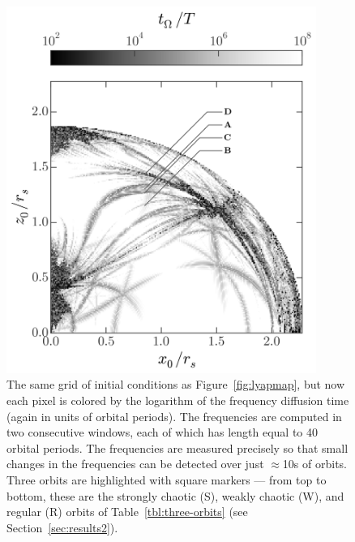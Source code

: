 \documentclass[letterpaper,12pt,preprint]{aastex}
\begin{document}
\begin{figure}[p]
\begin{center}
\includegraphics[width=0.9\textwidth, trim={0 1cm 0 0}]{figures/fdiff_map.png}
\caption{The same grid of initial conditions as Figure~\ref{fig:lyapmap}, but now each pixel is colored by the logarithm of the frequency diffusion time (again in units of orbital periods). The frequencies are computed in two consecutive windows, each of which has length equal to 40 orbital periods. The frequencies are measured precisely so that small changes in the frequencies can be detected over just $\approx$10s of orbits. Three orbits are highlighted with square markers --- from top to bottom, these are the strongly chaotic (S), weakly chaotic (W), and regular (R) orbits of Table~\ref{tbl:three-orbits} (see Section~\ref{sec:results2}).} \label{fig:freqdiff}
\end{center}
\end{figure}
\end{document}
